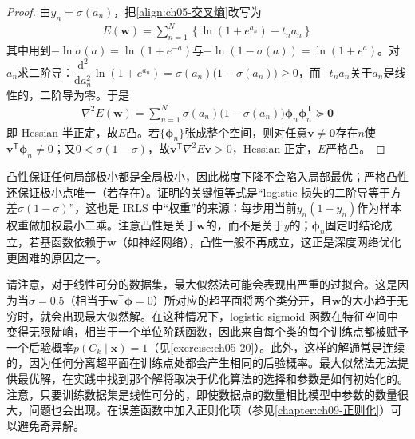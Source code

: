 \documentclass[../../main.tex]{subfiles}
\begin{document}
\begin{proof}
由$y_n=\sigma(a_n)$，把\eqref{align:ch05-交叉熵}改写为
\begin{align}
  E(\boldsymbol{w})=\sum_{n=1}^{N}\left\{\ln\left(1+e^{a_n}\right)-t_na_n\right\}
\end{align}
其中用到$-\ln\sigma(a)=\ln(1+e^{-a})$与$-\ln(1-\sigma(a))=\ln(1+e^{a})$。对$a_n$求二阶导：$\dfrac{\mathrm{d}^{2}}{\mathrm{d}a_n^{2}}\ln(1+e^{a_n})=\sigma(a_n)\bigl(1-\sigma(a_n)\bigr)\geqslant 0$，而$-t_na_n$关于$a_n$是线性的，二阶导为零。于是
\begin{align}
  \nabla^{2}E(\boldsymbol{w})=\sum_{n=1}^{N}\sigma(a_n)\bigl(1-\sigma(a_n)\bigr)\boldsymbol{\phi}_n\boldsymbol{\phi}_n^{\mathsf{T}}\succeq\boldsymbol{0}
\end{align}
即 Hessian 半正定，故$E$凸。若$\{\boldsymbol{\phi}_n\}$张成整个空间，则对任意$\boldsymbol{v}\neq\boldsymbol{0}$存在$n$使$\boldsymbol{v}^{\mathsf{T}}\boldsymbol{\phi}_n\neq0$；又$0<\sigma(1-\sigma)$，故$\boldsymbol{v}^{\mathsf{T}}\nabla^{2}E\boldsymbol{v}>0$，Hessian 正定，$E$严格凸。
\end{proof}

\begin{remark}
凸性保证任何局部极小都是全局极小，因此梯度下降不会陷入局部最优；严格凸性还保证极小点唯一（若存在）。证明的关键恒等式是“logistic 损失的二阶导等于方差$\sigma(1-\sigma)$”，这也是 IRLS 中“权重”的来源：每步用当前$y_n(1-y_n)$作为样本权重做加权最小二乘。注意凸性是关于$\boldsymbol{w}$的，而不是关于$y$的；$\boldsymbol{\phi}_n$固定时结论成立，若基函数依赖于$\boldsymbol{w}$（如神经网络），凸性一般不再成立，这正是深度网络优化更困难的原因之一。
\end{remark}

请注意，对于线性可分的数据集，最大似然法可能会表现出严重的过拟合。这是因为当$\sigma=0.5$（相当于$\boldsymbol{w}^{\mathsf{T}}\boldsymbol{\phi}=0$）所对应的超平面将两个类分开，且$\boldsymbol{w}$的大小趋于无穷时，就会出现最大似然解。在这种情况下，logistic sigmoid 函数在特征空间中变得无限陡峭，相当于一个单位阶跃函数，因此来自每个类的每个训练点都被赋予一个后验概率$p(C_k\mid\boldsymbol{x})=1$（见\cref{exercise:ch05-20}）。此外，这样的解通常是连续的，因为任何分离超平面在训练点处都会产生相同的后验概率。最大似然法无法提供最优解，在实践中找到那个解将取决于优化算法的选择和参数是如何初始化的。注意，只要训练数据集是线性可分的，即使数据点的数量相比模型中参数的数量很大，问题也会出现。在误差函数中加入正则化项（参见\cref{chapter:ch09-正则化}）可以避免奇异解。
\end{document}
